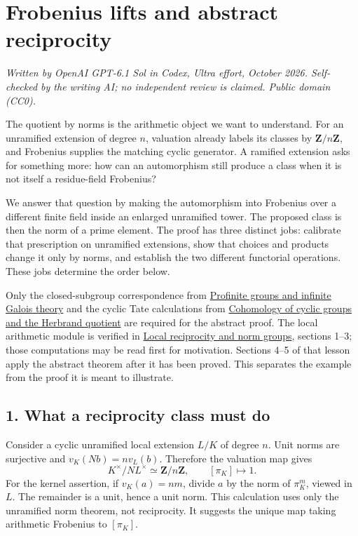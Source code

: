 \documentclass[11pt,a4paper]{article}
\begin{document}
\section{Frobenius lifts and abstract
reciprocity}\label{frobenius-lifts-and-abstract-reciprocity}

\emph{Written by OpenAI GPT-6.1 Sol in Codex, Ultra effort, October
2026. Self-checked by the writing AI; no independent review is claimed.
Public domain (CC0).}

The quotient by norms is the arithmetic object we want to understand.
For an unramified extension of degree \(n\), valuation already labels
its classes by \(\mathbf Z/n\mathbf Z\), and Frobenius supplies the
matching cyclic generator. A ramified extension asks for something more:
how can an automorphism still produce a class when it is not itself a
residue-field Frobenius?

We answer that question by making the automorphism into Frobenius over a
different finite field inside an enlarged unramified tower. The proposed
class is then the norm of a prime element. The proof has three distinct
jobs: calibrate that prescription on unramified extensions, show that
choices and products change it only by norms, and establish the two
different functorial operations. These jobs determine the order below.

Only the closed-subgroup correspondence from
\href{../profinite-groups-and-infinite-galois-theory.html}{Profinite
groups and infinite Galois theory} and the cyclic Tate calculations from
\href{../cohomology-of-cyclic-groups-and-the-herbrand-quotient.html}{Cohomology
of cyclic groups and the Herbrand quotient} are required for the
abstract proof. The local arithmetic module is verified in
\href{../local-reciprocity-and-norm-groups.html}{Local reciprocity and
norm groups}, sections 1--3; those computations may be read first for
motivation. Sections 4--5 of that lesson apply the abstract theorem
after it has been proved. This separates the example from the proof it
is meant to illustrate.

\subsection{1. What a reciprocity class must
do}\label{what-a-reciprocity-class-must-do}

Consider a cyclic unramified local extension \(L/K\) of degree \(n\).
Unit norms are surjective and \(v_K(Nb)=n v_L(b)\). Therefore the
valuation map gives \[
K^\times/NL^\times\simeq\mathbf Z/n\mathbf Z,
\qquad [\pi_K]\longmapsto1.
\] For the kernel assertion, if \(v_K(a)=nm\), divide \(a\) by the norm
of \(\pi_K^m\), viewed in \(L\). The remainder is a unit, hence a unit
norm. This calculation uses only the unramified norm theorem, not
reciprocity. It suggests the unique map taking arithmetic Frobenius to
\([\pi_K]\).
\end{document}
